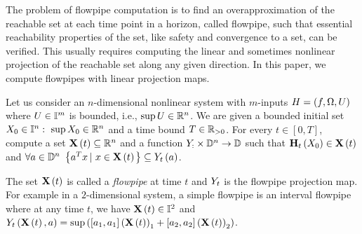 The problem of flowpipe computation is to find an overapproximation of
the reachable set at each time point in a horizon, called flowpipe,
such that essential reachability properties of the set, like safety
and convergence to a set, can be verified.  This usually requires
computing the linear and sometimes nonlinear projection of the
reachable set along any given direction.  In this paper, we compute
flowpipes with linear projection maps.
%
\begin{problem}
Let us consider an $n$-dimensional nonlinear system with $m$-inputs $H
= \left(f,\Omega,U\right)$ where $U\in\mathbb{I}^m$ is bounded, i.e.,
$\sup{U}\in\mathbb{R}^n$.  We are given a bounded initial set
$X_0\in\mathbb{I}^n:~\sup{X_0}\in\mathbb{R}^n$ and a time bound
$T\in\mathbb{R}_{> 0}$.  For every $t\in[0,T]$, compute a set
$\mathbf{X}\left(t\right)\subseteq \mathbb{R}^n$ and a function
$Y_{:}\times\mathbb{D}^n\rightarrow \mathbb{D}$ such that
$\mathbf{H}_{t}\left(X_0\right)\in\mathbf{X}\left(t\right)$ and $\forall
a\in\mathbb{D}^n~\left\{a^Tx\left|~x\in\mathbf{X}\left(t\right)\right.\right\}\subseteq
Y_{t}\left(a\right)$.
\end{problem}
%
The set $\mathbf{X}\left(t\right)$ is called a 
\emph{flowpipe} at time $t$ and $Y_{t}$ is the flowpipe projection map.
For example in a $2$-dimensional system, a simple flowpipe is an
interval flowpipe where at any time $t$, we have
$\mathbf{X}\left(t\right)\in\mathbb{I}^2$ and $Y_{t}\left(\mathbf{X}\left(t\right),a\right) =
\sup\left([a_1,a_1]\left(\mathbf{X}\left(t\right)\right)_1 + [a_2,a_2]\left(\mathbf{X}\left(t\right)\right)_2\right)$.

